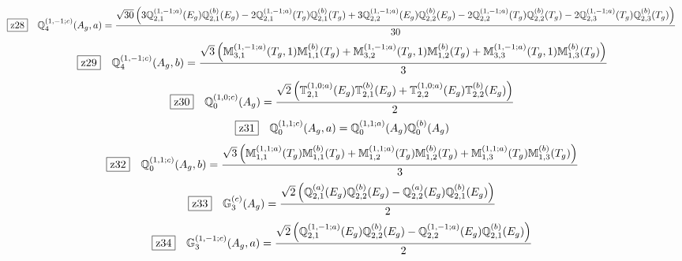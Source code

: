 \documentclass[fleqn,10pt,landscape]{jsarticle}
\begin{document}
\begin{dmath*}
\hspace*{3mm}\fbox{z28}\quad \mathbb{Q}_{4}^{(1,-1;c)}(A_{g},a)=\frac{\sqrt{30} \left(3 \mathbb{Q}_{2,1}^{(1,-1;a)}(E_{g}) \mathbb{Q}_{2,1}^{(b)}(E_{g}) - 2 \mathbb{Q}_{2,1}^{(1,-1;a)}(T_{g}) \mathbb{Q}_{2,1}^{(b)}(T_{g}) + 3 \mathbb{Q}_{2,2}^{(1,-1;a)}(E_{g}) \mathbb{Q}_{2,2}^{(b)}(E_{g}) - 2 \mathbb{Q}_{2,2}^{(1,-1;a)}(T_{g}) \mathbb{Q}_{2,2}^{(b)}(T_{g}) - 2 \mathbb{Q}_{2,3}^{(1,-1;a)}(T_{g}) \mathbb{Q}_{2,3}^{(b)}(T_{g})\right)}{30}
\end{dmath*}
\begin{dmath*}
\hspace*{3mm}\fbox{z29}\quad \mathbb{Q}_{4}^{(1,-1;c)}(A_{g},b)=\frac{\sqrt{3} \left(\mathbb{M}_{3,1}^{(1,-1;a)}(T_{g},1) \mathbb{M}_{1,1}^{(b)}(T_{g}) + \mathbb{M}_{3,2}^{(1,-1;a)}(T_{g},1) \mathbb{M}_{1,2}^{(b)}(T_{g}) + \mathbb{M}_{3,3}^{(1,-1;a)}(T_{g},1) \mathbb{M}_{1,3}^{(b)}(T_{g})\right)}{3}
\end{dmath*}
\begin{dmath*}
\hspace*{3mm}\fbox{z30}\quad \mathbb{Q}_{0}^{(1,0;c)}(A_{g})=\frac{\sqrt{2} \left(\mathbb{T}_{2,1}^{(1,0;a)}(E_{g}) \mathbb{T}_{2,1}^{(b)}(E_{g}) + \mathbb{T}_{2,2}^{(1,0;a)}(E_{g}) \mathbb{T}_{2,2}^{(b)}(E_{g})\right)}{2}
\end{dmath*}
\begin{dmath*}
\hspace*{3mm}\fbox{z31}\quad \mathbb{Q}_{0}^{(1,1;c)}(A_{g},a)=\mathbb{Q}_{0}^{(1,1;a)}(A_{g}) \mathbb{Q}_{0}^{(b)}(A_{g})
\end{dmath*}
\begin{dmath*}
\hspace*{3mm}\fbox{z32}\quad \mathbb{Q}_{0}^{(1,1;c)}(A_{g},b)=\frac{\sqrt{3} \left(\mathbb{M}_{1,1}^{(1,1;a)}(T_{g}) \mathbb{M}_{1,1}^{(b)}(T_{g}) + \mathbb{M}_{1,2}^{(1,1;a)}(T_{g}) \mathbb{M}_{1,2}^{(b)}(T_{g}) + \mathbb{M}_{1,3}^{(1,1;a)}(T_{g}) \mathbb{M}_{1,3}^{(b)}(T_{g})\right)}{3}
\end{dmath*}
\begin{dmath*}
\hspace*{3mm}\fbox{z33}\quad \mathbb{G}_{3}^{(c)}(A_{g})=\frac{\sqrt{2} \left(\mathbb{Q}_{2,1}^{(a)}(E_{g}) \mathbb{Q}_{2,2}^{(b)}(E_{g}) - \mathbb{Q}_{2,2}^{(a)}(E_{g}) \mathbb{Q}_{2,1}^{(b)}(E_{g})\right)}{2}
\end{dmath*}
\begin{dmath*}
\hspace*{3mm}\fbox{z34}\quad \mathbb{G}_{3}^{(1,-1;c)}(A_{g},a)=\frac{\sqrt{2} \left(\mathbb{Q}_{2,1}^{(1,-1;a)}(E_{g}) \mathbb{Q}_{2,2}^{(b)}(E_{g}) - \mathbb{Q}_{2,2}^{(1,-1;a)}(E_{g}) \mathbb{Q}_{2,1}^{(b)}(E_{g})\right)}{2}
\end{dmath*}
\end{document}
